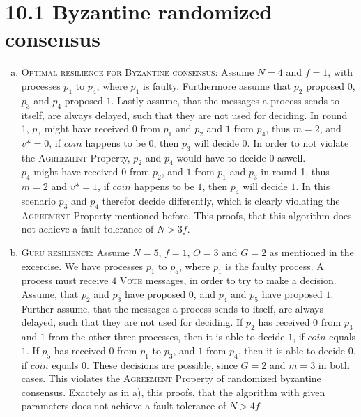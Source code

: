 \documentclass{article}
\begin{document}
	\pagestyle{fancy}
	
    \section*{10.1 Byzantine randomized consensus}
    \begin{enumerate}[a)]
        \item \textsc{Optimal resilience for Byzantine consensus:}
        Assume $N = 4$ and $f = 1$, with processes $p_1$ to $p_4$, where $p_1$ is faulty.
        Furthermore assume that $p_2$ proposed $0$, $p_3$ and $p_4$ proposed $1$.
        Lastly assume, that the messages a process sends to itself, are always delayed, such that they are not used for deciding.
        In round 1, $p_3$ might have received  $0$ from $p_1$ and $p_2$ and $1$ from $p_4$, thus $m = 2$, and $v* = 0$, if $coin$ happens to be $0$, then $p_3$ will decide $0$.
        In order to not violate the \textsc{Agreement} Property, $p_2$ and $p_4$ would have to decide $0$ aswell.\\
        $p_4$ might have received $0$ from $p_2$, and $1$ from $p_1$ and $p_3$ in round 1, thus $m = 2$ and $v* = 1$, if $coin$ happens to be $1$, then $p_4$ will decide $1$.
        In this scenario $p_3$ and $p_4$ therefor decide differently, which is clearly violating the \textsc{Agreement} Property mentioned before.
        This proofs, that this algorithm does not achieve a fault tolerance of $N > 3f$.

        \item \textsc{Guru resilience:}
        Assume $N = 5$, $f = 1$, $O = 3$ and $G = 2$ as mentioned in the excercise.
        We have processes $p_1$ to $p_5$, where $p_1$ is the faulty process.
        A process must receive $4$ \textsc{Vote} messages, in order to try to make a decision. 
        Assume, that $p_2$ and $p_3$ have proposed $0$, and $p_4$ and $p_5$ have proposed $1$.
        Further assume, that the messages a process sends to itself, are always delayed, such that they are not used for deciding.
        If $p_2$ has received $0$ from $p_3$ and $1$ from the other three processes, then it is able to decide $1$, if $coin$ equals $1$.
        If $p_5$ has received $0$ from $p_1$ to $p_3$, and $1$ from $p_4$, then it is able to decide $0$, if $coin$ equals $0$.
        These decisions are possible, since $G = 2$ and $m = 3$ in both cases.
        This violates the \textsc{Agreement} Property of randomized byzantine consensus.
        Exactely as in a), this proofs, that the algorithm with given parameters does not achieve a fault tolerance of $N > 4f$.


\end{enumerate}
\end{document}
